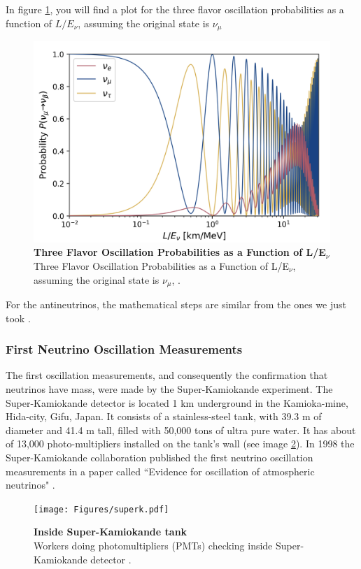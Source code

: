 In figure \ref{fig:nu_osc_prob}, you will find a plot for the three flavor oscillation probabilities as a function of $L/E_{\nu}$, assuming the original state is $\nu_{\mu}$

\begin{figure}[h!]
	\begin{center}
		\includegraphics[scale=0.2]{Figures/three_flavor_osc.jpg}
		\caption[Three Flavor Oscillation Model]{\textbf{Three Flavor Oscillation Probabilities as a Function of L/E$_{\nu}$} \\Three Flavor Oscillation Probabilities as a Function of L/E$_{\nu}$, assuming the original state is $\nu_{\mu}$, \cite{Lauren_thesis}.}
		\label{fig:nu_osc_prob}
	\end{center}
\end{figure}

For the antineutrinos, the mathematical steps are similar from the ones we just took \cite{oscillation_math}. 

\subsubsection{First Neutrino Oscillation Measurements}
The first oscillation measurements, and consequently the confirmation that neutrinos have mass, were made by the Super-Kamiokande experiment. The Super-Kamiokande detector is located 1 km underground in the Kamioka-mine, Hida-city, Gifu, Japan. It consists of a stainless-steel tank, with 39.3 m of diameter and 41.4 m tall, filled with 50,000 tons of ultra pure water. It has about of 13,000 photo-multipliers installed on the tank's wall (see image \ref{superk_picture}).
In 1998 the Super-Kamiokande collaboration published the first neutrino oscillation measurements in a paper called ``Evidence for oscillation of atmospheric neutrinos" \cite{first_kamioka_measure}.
%
\begin{figure}[h!]
	\begin{center}
		\texttt{[image: Figures/superk.pdf]}
		\caption[Inside Super-Kamiokande tank]{ {\textbf{Inside Super-Kamiokande tank}}\\Workers doing photomultipliers (PMTs) checking inside Super-Kamiokande detector \cite{superk_picture}.}
		\label{superk_picture}	
	\end{center}
\end{figure}
%

